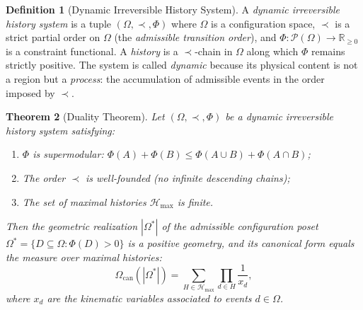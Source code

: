 \documentclass[12pt, oneside]{amsart}
\theoremstyle{plain}
\newtheorem{theorem}{Theorem}[section]
\theoremstyle{definition}
\newtheorem{definition}[theorem]{Definition}
\theoremstyle{remark}
\newcommand{\R}{\mathbb{R}}
\newcommand{\Phif}{\Phi}   %
\newcommand{\OmKS}{\Omega}
\newcommand{\CF}{\Omega_{\mathrm{can}}}
\newcommand{\Hmax}{\mathcal{H}_{\max}}
\begin{document}
\begin{definition}[Dynamic Irreversible History System]
\label{def:dynamic}
A \emph{dynamic irreversible history system} is a tuple $(\OmKS, \prec, \Phif)$ where $\OmKS$ is a configuration space, $\prec$ is a strict partial order on $\OmKS$ (the \emph{admissible transition order}), and $\Phif: \mathcal{P}(\OmKS) \to \R_{\geq 0}$ is a constraint functional. A \emph{history} is a $\prec$-chain in $\OmKS$ along which $\Phif$ remains strictly positive. The system is called \emph{dynamic} because its physical content is not a region but a \emph{process}: the accumulation of admissible events in the order imposed by $\prec$.
\end{definition}

\begin{theorem}[Duality Theorem]
\label{thm:duality}
Let $(\OmKS, \prec, \Phif)$ be a dynamic irreversible history system satisfying:
\begin{enumerate}[label=(\roman*)]
  \item $\Phif$ is supermodular: $\Phif(A) + \Phif(B) \leq \Phif(A \cup B) + \Phif(A \cap B)$;
  \item The order $\prec$ is well-founded (no infinite descending chains);
  \item The set of maximal histories $\Hmax$ is finite.
\end{enumerate}
Then the geometric realization $|\OmKS^*|$ of the admissible configuration poset $\OmKS^* = \{D \subseteq \OmKS : \Phif(D) > 0\}$ is a positive geometry, and its canonical form equals the measure over maximal histories:
\[
  \CF(|\OmKS^*|) = \sum_{H \in \Hmax} \prod_{d \in H} \frac{1}{x_d},
\]
where $x_d$ are the kinematic variables associated to events $d \in \OmKS$.
\end{theorem}
\end{document}
